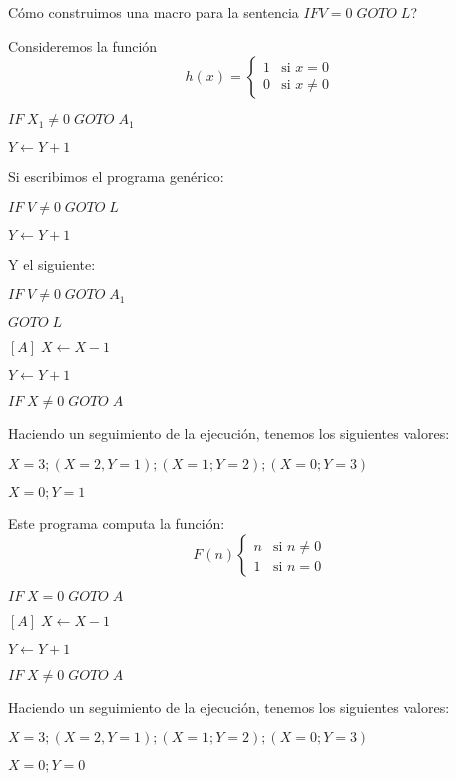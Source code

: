 \begin{example}
C\'omo construimos una macro para la sentencia $IF V = 0 \; GOTO \; L$?
 
Consideremos la funci\'on
\[
h(x) = 
\begin{cases}
	1	&\text{si $x = 0$} \\
	0	&\text{si $x \neq 0$}
\end{cases}
\]
$\;$
 
$IF \; X_1 \neq 0 \; GOTO \; A_1$
 
$Y \leftarrow Y + 1$
 
\hfill\break
Si escribimos el programa gen\'erico:
  
$IF \; V \neq 0 \; GOTO \; L$
 
$Y \leftarrow Y + 1$

Y el siguiente:
 
$IF \; V \neq 0 \; GOTO \; A_1$
 
$GOTO \; L$
 
\end{example}
 
\begin{example}
$[A] \; X \leftarrow X - 1$
 
$Y \leftarrow Y + 1$
 
$IF \; X \neq 0 \; GOTO \; A$
 
Haciendo un seguimiento de la ejecuci\'on, tenemos los siguientes valores:
 
$X = 3; (X = 2, Y = 1); (X = 1; Y = 2); (X = 0; Y = 3)$
 
$X = 0; Y = 1$

Este programa computa la funci\'on:
\[
F(n)
\begin{cases}
n	&\text{si $n \neq 0$} \\
1 	&\text{si $n = 0$}
\end{cases}
\]
\end{example}
 
\begin{example}
 
$IF \; X = 0 \; GOTO \; A$
 
$[A] \; X \leftarrow X - 1$
 
$Y \leftarrow Y + 1$
 
$IF \; X \neq 0 \; GOTO \;A$
  
Haciendo un seguimiento de la ejecuci\'on, tenemos los siguientes valores:
 
$X = 3; (X = 2, Y = 1); (X = 1; Y = 2); (X = 0; Y = 3)$
 
$X = 0; Y = 0$
\end{example}
 
